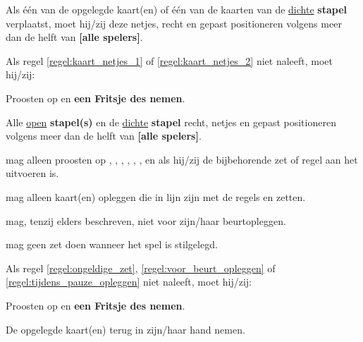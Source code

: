 \vervolgLijst{}
    \item Als \eenSpeler één van de opgelegde kaart(en) of één van de kaarten van de \ul{dichte} \textbf{stapel} verplaatst, moet hij/zij deze netjes, recht en gepast positioneren volgens meer dan de helft van \textbf{[alle spelers]}.
    \label{regel:kaart_netjes_2} 
\eindLijst{}

\vervolgLijst{}
    \item Als \eenSpeler regel \ref{regel:kaart_netjes_1} of \ref{regel:kaart_netjes_2} niet naleeft, moet hij/zij:
    \puntLijst{}
        \item Proosten op  en \textbf{een Fritsje des nemen}\footnotemark[1].
        \item Alle \ul{open} \textbf{stapel(s)} en de \ul{dichte} \textbf{stapel} recht, netjes en gepast positioneren volgens meer dan de helft van \textbf{[alle spelers]}. 
    \eindPuntLijst{}
\eindLijst{}


\vervolgLijst{}
    \item \EenSpeler mag alleen proosten op , , , , , ,  en  als hij/zij de bijbehorende zet of regel aan het uitvoeren is\footnotemark[2]. 
\eindLijst{}


\vervolgLijst{}
    \item \EenSpeler mag alleen kaart(en) opleggen die in lijn zijn met de regels en zetten.
    \label{regel:ongeldige_zet}
\eindLijst{}

\vervolgLijst{}
    \item \EenSpeler mag, tenzij elders beschreven, niet voor zijn/haar beurt\footnotemark[3] opleggen.
    \label{regel:voor_beurt_opleggen}
\eindLijst{}

\vervolgLijst{}
    \item \EenSpeler mag geen zet doen wanneer het spel is stilgelegd.
    \label{regel:tijdens_pauze_opleggen}
\eindLijst{}

\vervolgLijst{}
    \item Als \eenSpeler regel \ref{regel:ongeldige_zet}, \ref{regel:voor_beurt_opleggen} of \ref{regel:tijdens_pauze_opleggen} niet naleeft, moet hij/zij:
    \puntLijst{}
        \item Proosten op  en \textbf{een Fritsje des nemen}\footnotemark[1].
        \item De opgelegde kaart(en) terug in zijn/haar hand nemen.
    \eindPuntLijst{}
    \label{regel:kaarten_terugnemen_2}
\eindLijst{}

